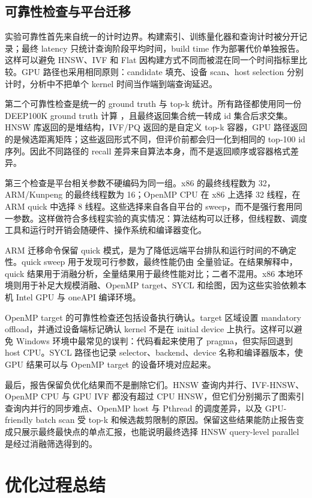 \documentclass[11pt,a4paper]{article}
\newcommand{\code}[1]{\texttt{\detokenize{#1}}}
\begin{document}
\subsection{可靠性检查与平台迁移}

实验可靠性首先来自统一的计时边界。构建索引、训练量化器和查询计时被分开记录；最终 latency 只统计查询阶段平均时间，build time 作为部署代价单独报告。这样可以避免 HNSW、IVF 和 Flat 因构建方式不同而被混在同一个时间指标里比较。GPU 路径也采用相同原则：candidate 填充、设备 scan、host selection 分别计时，分析中不把单个 kernel 时间当作端到端查询延迟。

第二个可靠性检查是统一的 ground truth 与 top-k 统计。所有路径都使用同一份 DEEP100K ground truth 计算 \code{recall@100}，且最终返回集合统一转成 id 集合后求交集。HNSW 库返回的是堆结构，IVF/PQ 返回的是自定义 top-k 容器，GPU 路径返回的是候选距离矩阵；这些返回形式不同，但评价前都会归一化到相同的 top-100 id 序列。因此不同路径的 recall 差异来自算法本身，而不是返回顺序或容器格式差异。

第三个检查是平台相关参数不硬编码为同一组。x86 的最终线程数为 32，ARM/Kunpeng 的最终线程数为 16；OpenMP CPU 在 x86 上选择 32 线程，在 ARM quick 中选择 8 线程。这些选择来自各自平台的 sweep，而不是强行套用同一参数。这样做符合多线程实验的真实情况：算法结构可以迁移，但线程数、调度工具和运行时开销会随硬件、操作系统和编译器变化。

ARM 迁移命令保留 quick 模式，是为了降低远端平台排队和运行时间的不确定性。quick sweep 用于发现可行参数，最终性能仍由 \code{test.sh} 全量验证。在结果解释中，quick 结果用于消融分析，全量结果用于最终性能对比；二者不混用。x86 本地环境则用于补足大规模消融、OpenMP target、SYCL 和绘图，因为这些实验依赖本机 Intel GPU 与 oneAPI 编译环境。

OpenMP target 的可靠性检查还包括设备执行确认。target 区域设置 mandatory offload，并通过设备端标记确认 kernel 不是在 initial device 上执行。这样可以避免 Windows 环境中最常见的误判：代码看起来使用了 \code{target} pragma，但实际回退到 host CPU。SYCL 路径也记录 selector、backend、device 名称和编译器版本，使 GPU 结果可以与 OpenMP target 的设备环境对应起来。

最后，报告保留负优化结果而不是删除它们。HNSW 查询内并行、IVF-HNSW、OpenMP CPU 与 GPU IVF 都没有超过 CPU HNSW，但它们分别揭示了图索引查询内并行的同步难点、OpenMP host 与 Pthread 的调度差异，以及 GPU-friendly batch scan 受 top-k 和候选裁剪限制的原因。保留这些结果能防止报告变成只展示最终最快点的单点汇报，也能说明最终选择 HNSW query-level parallel 是经过消融筛选得到的。

\section{优化过程总结}
\end{document}
